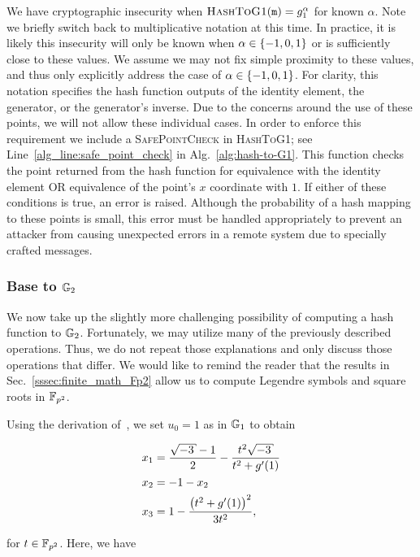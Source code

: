 We have cryptographic insecurity when
$\textsc{HashToG1}(\texttt{m}) = g_{1}^{\alpha}$ for known $\alpha$.
Note we briefly switch back to multiplicative notation at this time.
In practice, it is likely this insecurity will only be known when
$\alpha\in\left\{ -1,0,1 \right\}$ or is sufficiently close to these values.
We assume we may not fix simple proximity to these values, and thus only
explicitly address the case of $\alpha\in\left\{ -1,0,1 \right\}$.
For clarity, this notation specifies the hash function outputs of
the identity element, the generator, or the generator's
inverse.
Due to the concerns around the use of these points, we will not allow these
individual cases.
In order to enforce this requirement we include a
\textsc{SafePointCheck} in \textsc{HashToG1};
see Line~\ref{alg_line:safe_point_check} in Alg.~\ref{alg:hash-to-G1}.
This function checks the point returned from the hash function for
equivalence with the identity element OR equivalence of the point's
$x$ coordinate with $1$.
If either of these conditions is true, an error is raised.
Although the probability of a hash mapping to these points is small, this
error must be handled appropriately to prevent an attacker from causing
unexpected errors in a remote system due to specially crafted messages.


\subsubsection{Base to $\mathbb{G}_{2}$}
\label{sssec:base-to-G2}

We now take up the slightly more challenging possibility
of computing a hash function to $\mathbb{G}_{2}$.
Fortunately, we may utilize many of
the previously described operations.
Thus, we do not repeat those explanations and only discuss
those operations that differ.
We would like to remind the reader that the results in
Sec.~\ref{sssec:finite_math_Fp2} allow
us to compute Legendre symbols and square roots in $\mathbb{F}_{p^{2}}$.

Using the derivation of~\cite[Section 3]{boneh2019h2cBLS12},
we set $u_{0}=1$ as in $\mathbb{G}_{1}$ to obtain

\begin{align}
    x_{1} &= \frac{\sqrt{-3}-1}{2} - \frac{t^{2}\sqrt{-3}}{t^{2}+g'(1)}
        \nonumber\\
    x_{2} &= -1 - x_{2} \nonumber\\
    x_{3} &= 1 - \frac{\parens{t^{2}+g'(1)}^{2}}{3t^{2}},
\end{align}

\noindent
for $t\in\mathbb{F}_{p^{2}}$.
Here, we have

